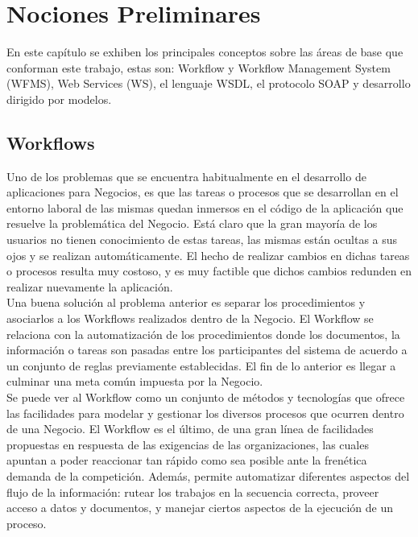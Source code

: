 \chapter{Nociones Preliminares}
\label{Nociones Preliminares}


En este capítulo se exhiben los principales conceptos sobre las áreas de base que conforman este trabajo, estas son: Workflow y Workflow Management System (WFMS), Web Services (WS), el lenguaje WSDL, el protocolo SOAP y  desarrollo dirigido por modelos.

\section{Workflows}
\label{Workflows}

Uno de los problemas que se encuentra habitualmente en el desarrollo de aplicaciones para Negocios, es que las tareas o procesos que se desarrollan en el entorno laboral de las mismas quedan inmersos en el código de la aplicación que resuelve la problemática del Negocio. Está claro que la gran mayoría de los usuarios no tienen conocimiento de estas tareas, las mismas están ocultas a sus ojos y se realizan automáticamente. El hecho de realizar cambios en dichas tareas o procesos resulta muy costoso, y es muy factible que dichos cambios redunden en realizar nuevamente la aplicación.\\

Una buena solución al problema anterior es separar los procedimientos y asociarlos a los Workflows realizados dentro de la Negocio. El Workflow se relaciona con la automatización de los procedimientos donde los documentos, la información o tareas son pasadas entre los participantes del sistema de acuerdo a un conjunto de reglas previamente establecidas. El fin de lo anterior es llegar a culminar una meta común impuesta por la Negocio.\\

Se puede ver al Workflow como un conjunto de métodos y tecnologías que ofrece las facilidades para modelar y gestionar los diversos procesos que ocurren dentro de una Negocio. El Workflow es el último, de una gran línea de facilidades propuestas en respuesta de las exigencias de las organizaciones, las cuales apuntan a poder reaccionar tan rápido como sea posible ante la frenética demanda de la competición. Además, permite automatizar diferentes aspectos del flujo de la información: rutear los trabajos en la secuencia correcta, proveer acceso a datos y documentos, y manejar ciertos aspectos de la ejecución de un proceso.\\

